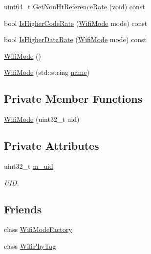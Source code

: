 \begin{DoxyCompactItemize}
\item 
uint64\+\_\+t \hyperlink{classns3_1_1WifiMode_a424b3e62606d8275a24fe442ab522ea4}{Get\+Non\+Ht\+Reference\+Rate} (void) const 
\item 
bool \hyperlink{classns3_1_1WifiMode_a9b1d07970b6b01f262f67bc2f6fcd053}{Is\+Higher\+Code\+Rate} (\hyperlink{classns3_1_1WifiMode}{Wifi\+Mode} mode) const 
\item 
bool \hyperlink{classns3_1_1WifiMode_afb7bad5cc1fb523bd3ac0e0d2f25b5ae}{Is\+Higher\+Data\+Rate} (\hyperlink{classns3_1_1WifiMode}{Wifi\+Mode} mode) const 
\item 
\hyperlink{classns3_1_1WifiMode_a06321569b2b5b0927e2b32d4ec6a9956}{Wifi\+Mode} ()
\item 
\hyperlink{classns3_1_1WifiMode_a6530806a45b08de3c65ff5e6723cb717}{Wifi\+Mode} (std\+::string \hyperlink{generate__test__data__lte__spectrum__model_8m_ab74e6bf80237ddc4109968cedc58c151}{name})
\end{DoxyCompactItemize}
\subsection*{Private Member Functions}
\begin{DoxyCompactItemize}
\item 
\hyperlink{classns3_1_1WifiMode_a1bb91de540425102ed8507cb129397ae}{Wifi\+Mode} (uint32\+\_\+t uid)
\end{DoxyCompactItemize}
\subsection*{Private Attributes}
\begin{DoxyCompactItemize}
\item 
uint32\+\_\+t \hyperlink{classns3_1_1WifiMode_ad63e4633ba59d019abfb07de0858727f}{m\+\_\+uid}
\begin{DoxyCompactList}\small\item\em U\+ID. \end{DoxyCompactList}\end{DoxyCompactItemize}
\subsection*{Friends}
\begin{DoxyCompactItemize}
\item 
class \hyperlink{classns3_1_1WifiMode_a3dd10420883b97bc4c80c2e5a999c5e4}{Wifi\+Mode\+Factory}
\item 
class \hyperlink{classns3_1_1WifiMode_ad524a1d0e1a9ae5b500765420c7b6b19}{Wifi\+Phy\+Tag}
\end{DoxyCompactItemize}


